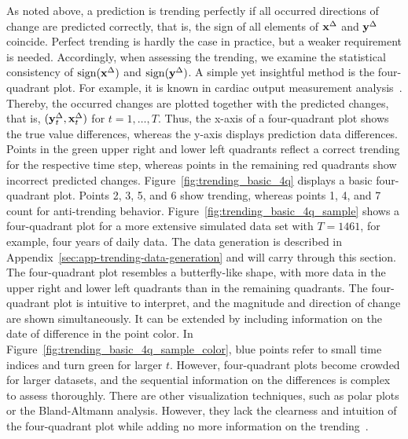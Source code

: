 As noted above, a prediction is trending perfectly if all occurred directions of change are predicted correctly, that is, the sign of all elements of $\mathbf{x}^{\Delta}$ and $\mathbf{y}^{\Delta}$ coincide.
Perfect trending is hardly the case in practice, but a weaker requirement is needed.
Accordingly, when assessing the trending, we examine the statistical consistency of $\operatorname{sign}(\mathbf{x}^{\Delta})$ and $\operatorname{sign}(\mathbf{y}^{\Delta})$.
A simple yet insightful method is the four-quadrant plot.
For example, it is known in cardiac output measurement analysis~\parencite{Saugel2015}.  
Thereby, the occurred changes are plotted together with the predicted changes, that is, $(\mathbf{y}^{\Delta}_t, \mathbf{x}^{\Delta}_t)$ for $t = 1, \dots, T$.
Thus, the x-axis of a four-quadrant plot shows the true value differences, whereas the y-axis displays prediction data differences.
Points in the green upper right and lower left quadrants reflect a correct trending for the respective time step, whereas points in the remaining red quadrants show incorrect predicted changes.
Figure~\ref{fig:trending_basic_4q} displays a basic four-quadrant plot.
Points 2, 3, 5, and 6 show trending, whereas points 1, 4, and 7 count for anti-trending behavior.
Figure~\ref{fig:trending_basic_4q_sample} shows a four-quadrant plot for a more extensive simulated data set with $T=1461$, for example, four years of daily data.
The data generation is described in Appendix~\ref{sec:app-trending-data-generation} and will carry through this section.
The four-quadrant plot resembles a butterfly-like shape, with more data in the upper right and lower left quadrants than in the remaining quadrants.
The four-quadrant plot is intuitive to interpret, and the magnitude and direction of change are shown simultaneously.
It can be extended by including information on the date of difference in the point color.
In Figure~\ref{fig:trending_basic_4q_sample_color}, blue points refer to small time indices and turn green for larger $t$.
However, four-quadrant plots become crowded for larger datasets, and the sequential information on the differences is complex to assess thoroughly.
There are other visualization techniques, such as polar plots or the Bland-Altmann analysis.
However, they lack the clearness and intuition of the four-quadrant plot while adding no more information on the trending~\parencite{Saugel2015}.

